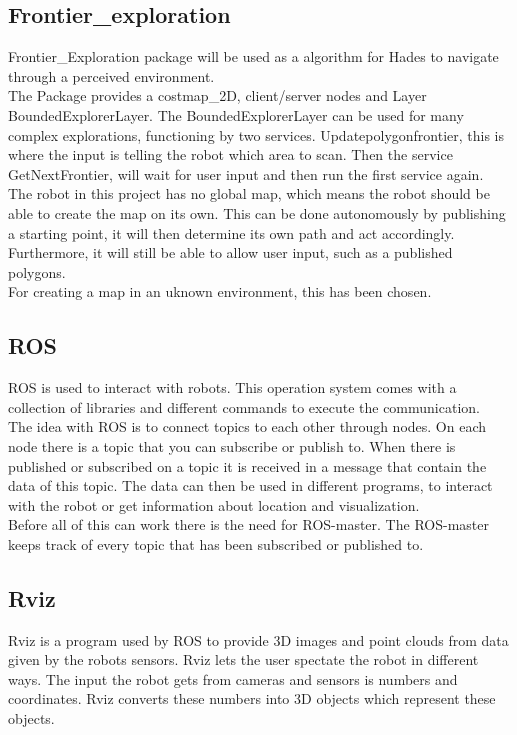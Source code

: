\subsection{Frontier\_exploration}
Frontier\_Exploration package will be used as a algorithm for Hades to navigate through a perceived environment.\\
The Package provides a costmap\_2D, client/server nodes and Layer BoundedExplorerLayer. The BoundedExplorerLayer can be used for many complex explorations, functioning by two services. Updatepolygonfrontier, this is where the input is telling the robot which area to scan. Then the service GetNextFrontier, will wait for user input and then run the first service again.\\
The robot in this project has no global map, which means the robot should be able to create the map on its own. This can be done autonomously by publishing a starting point, it will then determine its own path and act accordingly. Furthermore, it will still be able to allow user input, such as a published polygons\cite{ROSexploration}.\\
For creating a map in an uknown environment, this has been chosen.

\subsection{ROS}
ROS is used to interact with robots. This operation system comes with a collection of libraries and different commands to execute the communication.\\
The idea with ROS is to connect topics to each other through nodes. On each node there is a topic that you can subscribe or publish to. When there is published or subscribed on a topic it is received in a message that contain the data of this topic. The data can then be used in different programs, to interact with the robot or get information about location and visualization. \\
Before all of this can work there is the need for ROS-master. The ROS-master keeps track of every topic that has been subscribed or published to\cite{ROSwiki}.\\

\subsection{Rviz}
Rviz is a program used by ROS to provide 3D images and point clouds from data given by the robots sensors. Rviz lets the user spectate the robot in different ways. The input the robot gets from cameras and sensors is numbers and coordinates. Rviz converts these numbers into 3D objects which represent these objects\cite{interactiveMarkers}.\\

